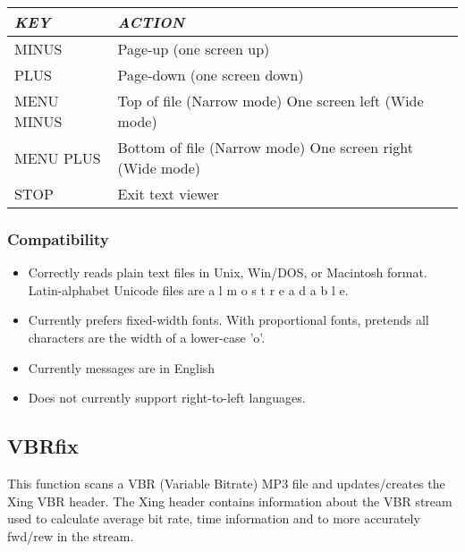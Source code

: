 \begin{tabular}[c]{|p{3.291cm}|p{7.131cm}|}
\hline
{\centering\bfseries\itshape
KEY
\par}
&
{\centering\bfseries\itshape
ACTION
\par}
\\\hline
{\centering
MINUS
\par}
&
Page{}-up (one screen up)
\\\hline
{\centering
PLUS
\par}
&
Page{}-down (one screen down)
\\\hline
{\centering
MENU MINUS
\par}
&
Top of file (Narrow mode)\newline
One screen left (Wide mode)
\\\hline
{\centering
MENU PLUS
\par}
&
Bottom of file (Narrow mode)\newline
One screen right (Wide mode)
\\\hline
{\centering
STOP
\par}
&
Exit text viewer
\\\hline
\end{tabular}

\subsubsection{Compatibility}

\begin{itemize}
\item Correctly reads plain text files in Unix, Win/DOS, or Macintosh
format. Latin{}-alphabet Unicode files are  a l m o s t  r e a d a b l
e.
\item Currently prefers fixed{}-width fonts. With proportional fonts,
pretends all characters are the width of a lower{}-case 'o'.
\item Currently messages are in English 
\item Does not currently support right{}-to{}-left languages.
\end{itemize}

\subsection{VBRfix}
This function scans a VBR (Variable Bitrate)
MP3 file and updates/creates the Xing VBR header. The Xing header
contains information about the VBR stream used to calculate average bit
rate, time information and to more accurately fwd/rew in the stream.


